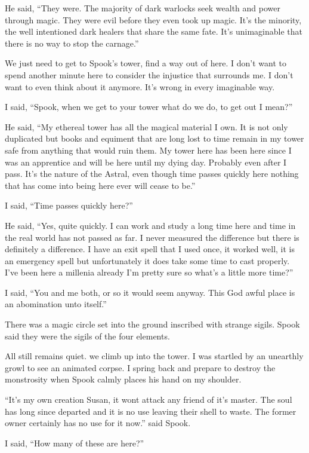 He said, ``They were. The majority of dark warlocks seek wealth and power through magic. They were evil before they even took up magic. It's the minority, the well intentioned dark healers that share the same fate. It's unimaginable that there is no way to stop the carnage.''

We just need to get to Spook's tower, find a way out of here. I don't want to spend another minute here to consider the injustice that surrounds me. I don't want to even think about it anymore. It's wrong in every imaginable way.

I said, ``Spook, when we get to your tower what do we do, to get out I mean?''

He said, ``My ethereal tower has all the magical material I own. It is not only duplicated but books and equiment that are long lost to time remain in my tower safe from anything that would ruin them. My tower here has been here since I was an apprentice and will be here until my dying day. Probably even after I pass. It's the nature of the Astral, even though time passes quickly here nothing that has come into being here ever will cease to be.''

I said, ``Time passes quickly here?''

He said, ``Yes, quite quickly. I can work and study a long time here and time in the real world has not passed as far. I never measured the difference but there is definitely a difference. I have an exit spell that I used once, it worked well, it is an emergency spell but unfortunately it does take some time to cast properly. I've been here a millenia already I'm pretty sure so what's a little more time?''

I said, ``You and me both, or so it would seem anyway. This God awful place is an abomination unto itself.''

There was a magic circle set into the ground inscribed with strange sigils. Spook said they were the sigils of the four elements.

All still remains quiet. we climb up into the tower. I was startled by an unearthly growl to see an animated corpse. I spring back and prepare to destroy the monstrosity when Spook calmly places his hand on my shoulder.

``It's my own creation Susan, it wont attack any friend of it's master. The soul has long since departed and it is no use leaving their shell to waste. The former owner certainly has no use for it now.'' said Spook.

I said, ``How many of these are here?''

